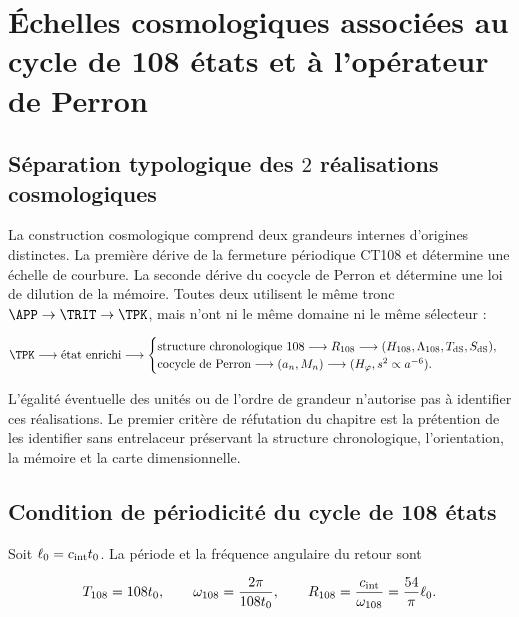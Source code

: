 \section{Échelles cosmologiques associées au cycle de 108 états et à l’opérateur de Perron}
\label{rm:ch:cosmo}

\subsection{Séparation typologique des \(2\) réalisations cosmologiques}

La construction cosmologique comprend deux grandeurs internes d’origines distinctes. La première dérive de la fermeture périodique CT108 et détermine une échelle de courbure. La seconde dérive du cocycle de Perron et détermine une loi de dilution de la mémoire. Toutes deux utilisent le même tronc \(\APP\to\TRIT\to\TPK\), mais n’ont ni le même domaine ni le même sélecteur :

{\footnotesize
\begin{equation}
\TPK\longrightarrow\text{état enrichi}
\longrightarrow
\begin{cases}
\text{structure chronologique }108\longrightarrow
R_{108}\longrightarrow(H_{108},\Lambda_{108},T_{\rm dS},S_{\rm dS}),\\
\text{cocycle de Perron}\longrightarrow
(a_n,M_n)\longrightarrow(H_\varphi,s^2\propto a^{-6}).
\end{cases}
\label{rm:eq:cosmo-two-branches}
\end{equation}
}

L’égalité éventuelle des unités ou de l’ordre de grandeur n’autorise pas à identifier ces réalisations. Le premier critère de réfutation du chapitre est la prétention de les identifier sans entrelaceur préservant la structure chronologique, l’orientation, la mémoire et la carte dimensionnelle.

\subsection{Condition de périodicité du cycle de 108 états}

Soit \(\ell_0=c_{\rm int}t_0\). La période et la fréquence angulaire du retour sont

\begin{equation}
T_{108}=108t_0,
\qquad
\omega_{108}=\frac{2\pi}{108t_0},
\qquad
R_{108}=\frac{c_{\rm int}}{\omega_{108}}
=\frac{54}{\pi}\ell_0.
\label{rm:eq:cosmo-R108}
\end{equation}

